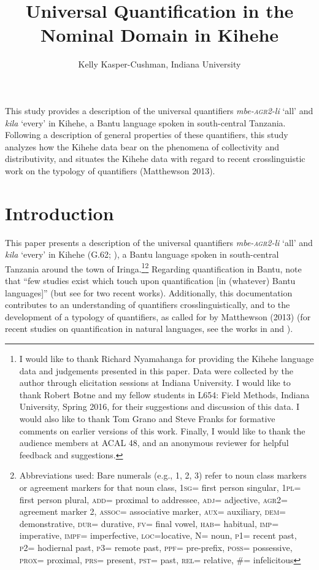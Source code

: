 \documentclass[letterpaper, 12pt]{article}
\title{Universal Quantification in the Nominal Domain in Kihehe}
\author{Kelly Kasper-Cushman, Indiana University}
\begin{document}
\maketitle

This study provides a description of the universal quantifiers \textit{mbe-\textsc{agr2}-li} `all' and \textit{kila} `every' in Kihehe, a Bantu language spoken in south-central Tanzania. Following a description of general properties of these quantifiers, this study analyzes how the Kihehe data bear on the phenomena of collectivity and distributivity, and situates the Kihehe data with regard to recent crosslinguistic work on the typology of quantifiers (Matthewson 2013).


\section{Introduction}

\indent This paper presents a description of the universal quantifiers \textit{mbe-\textsc{agr2}-li} `all' and \textit{kila} `every' in Kihehe (G.62; ), a Bantu language spoken in south-central Tanzania around the town of Iringa.\footnote{I would like to thank Richard Nyamahanga for providing the Kihehe language data and judgements presented in this paper. Data were collected by the author through elicitation sessions at Indiana University.  I would like to thank Robert Botne and my fellow students in L654: Field Methods, Indiana University, Spring 2016, for their suggestions and discussion of this data. I would also like to thank Tom Grano and Steve Franks for formative comments on earlier versions of this work. Finally, I would like to thank the audience members at ACAL 48, and an anonymous reviewer for helpful feedback and suggestions.}\footnote{Abbreviations used: Bare numerals (e.g., 1, 2, 3) refer to noun class markers or agreement markers for that noun class, \textsc{1sg}= first person singular, \textsc{1pl}= first person plural, \textsc{add}= proximal to addressee, \textsc{adj}= adjective, \textsc{agr2}= agreement marker 2, \textsc{assoc}= associative marker, \textsc{aux}= auxiliary, \textsc{dem}= demonstrative, \textsc{dur}= durative, \textsc{fv}= final vowel, \textsc{hab}= habitual, \textsc{imp}= imperative, \textsc{impf}= imperfective, \textsc{loc}=locative, N= noun, \textsc{p1}= recent past, \textsc{p2}= hodiernal past, \textsc{p3}= remote past, \textsc{ppf}= pre-prefix, \textsc{poss}= possessive, \textsc{prox}= proximal, \textsc{prs}= present, \textsc{pst}= past, \textsc{rel}= relative, \#= infelicitous} Regarding quantification in Bantu,  note that ``few studies exist which touch upon quantification [in (whatever) Bantu languages]'' (but see  for two recent works). Additionally, this documentation contributes to an understanding of quantifiers crosslinguistically, and to the development of a typology of quantifiers, as called for by Matthewson (2013) (for recent studies on quantification in natural languages, see the works in  and ).
\end{document}
